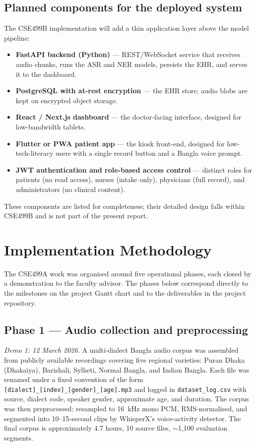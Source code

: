 \documentclass[12pt,a4paper]{article}
\begin{document}
\subsection{Planned components for the deployed system}
The CSE499B implementation will add a thin application layer above
the model pipeline:

\begin{itemize}[leftmargin=*]
\item \textbf{FastAPI backend (Python)} --- REST/WebSocket service
that receives audio chunks, runs the ASR and NER models, persists
the EHR, and serves it to the dashboard.
\item \textbf{PostgreSQL with at-rest encryption} --- the EHR store;
audio blobs are kept on encrypted object storage.
\item \textbf{React / Next.js dashboard} --- the doctor-facing
interface, designed for low-bandwidth tablets.
\item \textbf{Flutter or PWA patient app} --- the kiosk front-end,
designed for low-tech-literacy users with a single record button
and a Bangla voice prompt.
\item \textbf{JWT authentication and role-based access control} ---
distinct roles for patients (no read access), nurses (intake only),
physicians (full record), and administrators (no clinical content).
\end{itemize}

These components are listed for completeness; their detailed design
falls within CSE499B and is not part of the present report.

\section{Implementation Methodology}
\label{sec:phases}

The CSE499A work was organised around five operational phases, each
closed by a demonstration to the faculty advisor. The phases below
correspond directly to the milestones on the project Gantt chart and
to the deliverables in the project repository.

\subsection*{Phase 1 --- Audio collection and preprocessing}
\textit{Demo 1: 12 March 2026.}
A multi-dialect Bangla audio corpus was assembled from publicly
available recordings covering five regional varieties: Puran Dhaka
(Dhakaiya), Barishali, Sylheti, Normal Bangla, and Indian Bangla.
Each file was renamed under a fixed convention of the form
\texttt{[dialect]\_[index]\_[gender]\_[age].mp3} and logged in
\texttt{dataset\_log.csv} with source, dialect code, speaker gender,
approximate age, and duration. The corpus was then preprocessed:
resampled to 16~kHz mono PCM, RMS-normalised, and segmented into
10--15-second clips by WhisperX's voice-activity detector. The final
corpus is approximately 4.7 hours, 10 source files, $\sim$1{,}100
evaluation segments.
\end{document}
